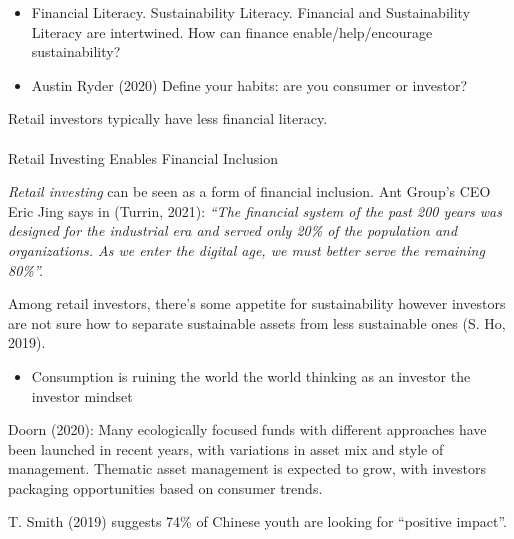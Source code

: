 \documentclass[
  letterpaper,
  DIV=11,
  numbers=noendperiod]{scrartcl}
\makeatletter
\let\oldparagraph\paragraph
\renewcommand{\paragraph}{
    \@ifstar
      \xxxParagraphStar
      \xxxParagraphNoStar
  }
\newcommand{\xxxParagraphStar}[1]{\oldparagraph*{#1}\mbox{}}
\newcommand{\xxxParagraphNoStar}[1]{\oldparagraph{#1}\mbox{}}
\providecommand{\tightlist}{%
  \setlength{\itemsep}{0pt}\setlength{\parskip}{0pt}}\usepackage{longtable,booktabs,array}
\makeatother
\begin{document}
\begin{itemize}
\tightlist
\item
  Financial Literacy. Sustainability Literacy. Financial and
  Sustainability Literacy are intertwined. How can finance
  enable/help/encourage sustainability?
\item
  Austin Ryder (2020) Define your habits: are you consumer or investor?
\end{itemize}

Retail investors typically have less financial literacy.

\paragraph{Retail Investing Enables Financial
Inclusion}\label{retail-investing-enables-financial-inclusion}

\emph{Retail investing} can be seen as a form of financial inclusion.
Ant Group's CEO Eric Jing says in (Turrin, 2021): \emph{``The financial
system of the past 200 years was designed for the industrial era and
served only 20\% of the population and organizations. As we enter the
digital age, we must better serve the remaining 80\%''.}

Among retail investors, there's some appetite for sustainability however
investors are not sure how to separate sustainable assets from less
sustainable ones (S. Ho, 2019).

\begin{itemize}
\tightlist
\item
  Consumption is ruining the world the world thinking as an investor the
  investor mindset
\end{itemize}

Doorn (2020): Many ecologically focused funds with different approaches
have been launched in recent years, with variations in asset mix and
style of management. Thematic asset management is expected to grow, with
investors packaging opportunities based on consumer trends.

T. Smith (2019) suggests 74\% of Chinese youth are looking for
``positive impact''.
\end{document}
